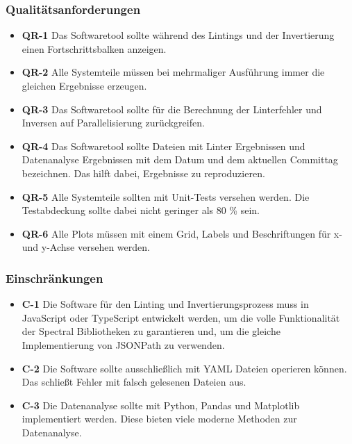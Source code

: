 \subsubsection{Qualitätsanforderungen} \label{sec:qualitätsanforderungen}
\begin{itemize}
  \item \textbf{QR-1} Das Softwaretool sollte während des Lintings und der Invertierung einen Fortschrittsbalken anzeigen.
  \item \textbf{QR-2} Alle Systemteile müssen bei mehrmaliger Ausführung immer die gleichen Ergebnisse erzeugen.
  \item \textbf{QR-3} Das Softwaretool sollte für die Berechnung der Linterfehler und Inversen auf Parallelisierung zurückgreifen.
  \item \textbf{QR-4} Das Softwaretool sollte Dateien mit Linter Ergebnissen und Datenanalyse Ergebnissen mit dem Datum und dem aktuellen Committag bezeichnen. Das hilft dabei, Ergebnisse zu reproduzieren.
  \item \textbf{QR-5} Alle Systemteile sollten mit Unit-Tests versehen werden. Die Testabdeckung sollte dabei nicht geringer als 80 \% sein.
  \item \textbf{QR-6} Alle Plots müssen mit einem Grid, Labels und Beschriftungen für x- und y-Achse versehen werden. 
\end{itemize}


\subsubsection{Einschränkungen} \label{sec:einschränkungen}
\begin{itemize}
  \item \textbf{C-1} Die Software für den Linting und Invertierungsprozess muss in JavaScript oder TypeScript entwickelt werden, um die volle Funktionalität der Spectral Bibliotheken zu garantieren und, um die gleiche Implementierung von JSONPath zu verwenden.
  \item \textbf{C-2} Die Software sollte ausschließlich mit \acs{YAML} Dateien operieren können. Das schließt Fehler mit falsch gelesenen Dateien aus.
  \item \textbf{C-3} Die Datenanalyse sollte mit Python, Pandas und Matplotlib implementiert werden. Diese bieten viele moderne Methoden zur Datenanalyse.
\end{itemize}


